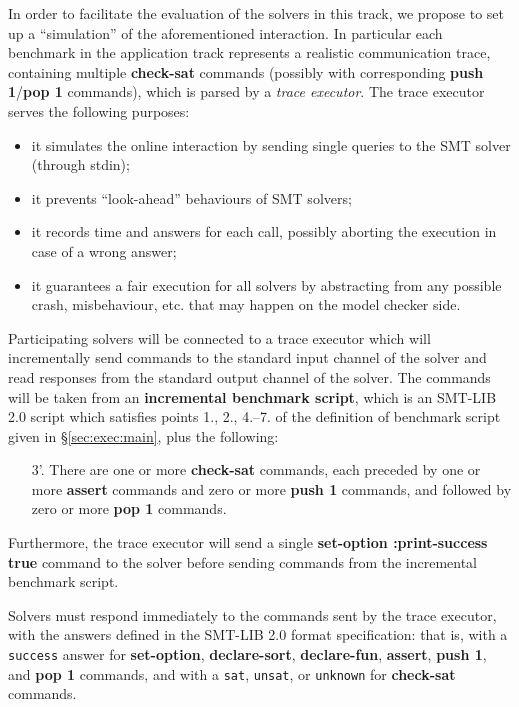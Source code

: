 \documentclass[12pt]{article}
\newcommand{\akey}[1]{\textbf{#1}}
\begin{document}
In order to facilitate the evaluation of the solvers in this track, we
propose to set up a ``simulation'' of the aforementioned interaction. In
particular each benchmark in the application track represents a realistic
communication trace, containing multiple \akey{check-sat} commands (possibly
with corresponding \akey{push 1}/\akey{pop 1} commands), which
is parsed by a {\em trace executor}. The trace executor serves the following purposes:
\begin{itemize}
\item it simulates the online interaction by sending single queries to the SMT solver
      (through stdin);
\item it prevents ``look-ahead'' behaviours of SMT solvers;
\item it records time and answers for each call, possibly aborting the execution
      in case of a wrong answer;
\item it guarantees a fair execution for all solvers by abstracting from any possible
      crash, misbehaviour, etc. that may happen on the model checker side.
\end{itemize}

Participating solvers will be connected to a trace executor 
which will incrementally send commands to the standard input channel of the solver
and read responses from the standard output channel of the solver.
The commands will be taken from an \textbf{incremental benchmark script},
which is an SMT-LIB 2.0 script which satisfies points 1., 2., 4.--7. of the definition of benchmark script given in \S\ref{sec:exec:main}, plus the following:

\begin{enumerate}
\item[3'.] There are one or more \akey{check-sat} commands, 
  each preceded by one or more \akey{assert} commands 
  and zero or more \akey{push 1} commands, 
  and followed by zero or more \akey{pop 1} commands.
\end{enumerate}

\noindent
Furthermore, the trace executor will send a single 
\akey{set-option :print-success true} command to the solver before 
sending commands from the incremental benchmark script.

\medskip
Solvers must respond immediately to the commands sent by the trace executor, 
with the answers defined in the SMT-LIB 2.0 format specification: that is,
with a \texttt{success} answer for 
\akey{set-option}, 
\akey{declare-sort}, 
\akey{declare-fun}, 
\akey{assert}, 
\akey{push 1}, 
and \akey{pop 1} 
commands,
and with a \texttt{sat}, \texttt{unsat}, or \texttt{unknown} 
for \akey{check-sat} commands.
\end{document}
